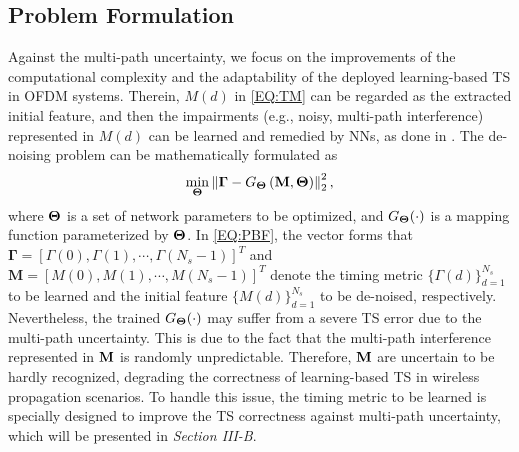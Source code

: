 \documentclass[conference]{IEEEtran}
\begin{document}
\subsection{Problem Formulation}
Against the multi-path uncertainty, we focus on the improvements of the computational complexity and the adaptability of the deployed learning-based TS in OFDM systems.
Therein, $M(d)$ in \eqref{EQ:TM} can be regarded as the extracted initial feature, and then the impairments (e.g., noisy, multi-path interference) represented in $M(d)$ can be learned and remedied by NNs, as done in \cite{ref:ELM-labelTS}.
The de-noising problem can be mathematically formulated as
\begin{equation}\label{EQ:PBF}
\mathop {\min }\limits_{{\bf \Theta }} \left\| {{\mathbf{\Gamma}} - {G_{\bf \Theta} }\left( {\bf{M,{\Theta}}} \right)} \right\|_2^2,
\end{equation}
where $\bf\Theta$ is a set of network parameters to be optimized, and $G_{\bf\Theta}(\cdot)$ is a mapping function parameterized by $\bf\Theta$. In \eqref{EQ:PBF}, the vector forms that ${\mathbf{\Gamma}}=[\Gamma(0),\Gamma(1),\cdots,\Gamma(N_s-1)]^T$ and $\mathbf{M}=[M(0),M(1),\cdots,M(N_s-1)]^T$ denote the timing metric $\{\Gamma(d)\}^{N_s}_{d=1}$ to be learned and the initial feature $\{M(d)\}^{N_s}_{d=1}$ to be de-noised, respectively.
Nevertheless, the trained $G_{\bf\Theta}(\cdot)$ may suffer from a severe TS error due to the multi-path uncertainty. This is due to the fact that the multi-path interference represented in $\bf M$ is randomly unpredictable. Therefore, $\bf M$ are uncertain to be hardly recognized, degrading the correctness of learning-based TS in wireless propagation scenarios.
To handle this issue, the timing metric to be learned is specially designed to improve the TS correctness against multi-path uncertainty, which will be presented in \emph{Section III-B}.

\begin{table}
\vspace{-5mm}
\renewcommand{\arraystretch}{1.25}
\caption{Network Architecture}
\label{table_I}
\centering
\scriptsize
{}
\vspace{-3mm}
\end{table}
\end{document}
